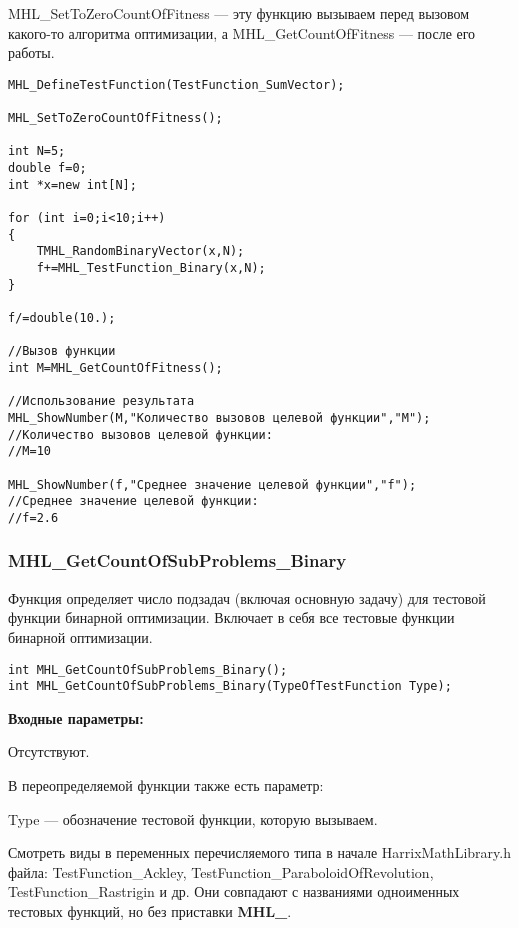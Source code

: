 \documentclass[a4paper,12pt]{article}
\begin{document}
MHL\_SetToZeroCountOfFitness --- эту функцию вызываем перед вызовом какого-то алгоритма оптимизации, а MHL\_GetCountOfFitness --- после его работы.


\begin{lstlisting}[label=code_use_MHL_GetCountOfFitness,caption=Пример использования]
MHL_DefineTestFunction(TestFunction_SumVector);

MHL_SetToZeroCountOfFitness();

int N=5;
double f=0;
int *x=new int[N];

for (int i=0;i<10;i++)
{
    TMHL_RandomBinaryVector(x,N);
    f+=MHL_TestFunction_Binary(x,N);
}

f/=double(10.);

//Вызов функции
int M=MHL_GetCountOfFitness();

//Использование результата
MHL_ShowNumber(M,"Количество вызовов целевой функции","M");
//Количество вызовов целевой функции:
//M=10

MHL_ShowNumber(f,"Среднее значение целевой функции","f");
//Среднее значение целевой функции:
//f=2.6
\end{lstlisting}

\subsubsection{MHL\_GetCountOfSubProblems\_Binary}\label{MHL_GetCountOfSubProblems_Binary}

Функция определяет число подзадач (включая основную задачу) для тестовой функции бинарной оптимизации. Включает в себя все тестовые функции бинарной оптимизации.


\begin{lstlisting}[label=code_syntax_MHL_GetCountOfSubProblems_Binary,caption=Синтаксис]
int MHL_GetCountOfSubProblems_Binary();
int MHL_GetCountOfSubProblems_Binary(TypeOfTestFunction Type);
\end{lstlisting}

\textbf{Входные параметры:}

Отсутствуют.

В переопределяемой функции также есть параметр:
  
Type --- обозначение тестовой функции, которую вызываем.

Смотреть виды в переменных перечисляемого типа в начале HarrixMathLibrary.h файла: TestFunction\_Ackley, TestFunction\_ParaboloidOfRevolution, TestFunction\_Rastrigin и др. Они совпадают с названиями одноименных тестовых функций, но без приставки \textbf{MHL\_}.
\end{document}

